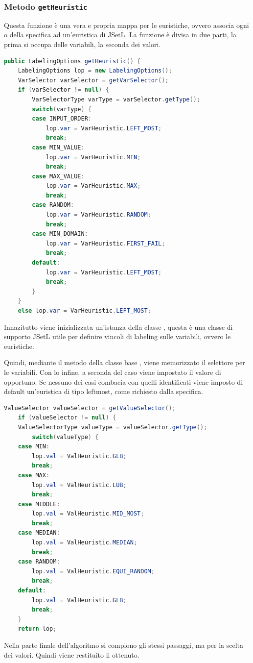 \subsubsection{Metodo \texttt{getHeuristic}}
Questa funzione è una vera e propria mappa per le euristiche, ovvero associa
ogni  o  della specifica ad
un'euristica di JSetL. La funzione è divisa in due parti, la prima si occupa
delle variabili, la seconda dei valori.
\begin{lstlisting}[language = Java,
                   caption = {\files{getHeuristic}, le variabili.}]
public LabelingOptions getHeuristic() {
	LabelingOptions lop = new LabelingOptions();
	VarSelector varSelector = getVarSelector();
	if (varSelector != null) {
		VarSelectorType varType = varSelector.getType();
		switch(varType) {
		case INPUT_ORDER: 
			lop.var = VarHeuristic.LEFT_MOST;
			break;
		case MIN_VALUE:
			lop.var = VarHeuristic.MIN;
			break;
		case MAX_VALUE:
			lop.var = VarHeuristic.MAX;
			break;
		case RANDOM:
			lop.var = VarHeuristic.RANDOM;
			break;
		case MIN_DOMAIN:
			lop.var = VarHeuristic.FIRST_FAIL;
			break;
		default:
			lop.var = VarHeuristic.LEFT_MOST;
			break;
		}
	}
	else lop.var = VarHeuristic.LEFT_MOST;
\end{lstlisting}
Innazitutto viene inizializzata un'istanza della classe
, questa è una classe di supporto JSetL utile per 
definire vincoli di labeling sulle variabili, ovvero le euristiche.

Quindi, mediante il metodo della classe base , viene
memorizzato il selettore per le variabili. Con lo  infine, a 
seconda del caso viene impostato il valore di  opportuno.
Se nessuno dei casi combacia con quelli identificati viene imposto di default
un'euristica di tipo leftmost, come richiesto dalla specifica.
\begin{lstlisting}[language = Java,
                   caption = {\files{getHeuristic}, i valori.}]
    ValueSelector valueSelector = getValueSelector();
    if (valueSelector != null) {
	ValueSelectorType valueType = valueSelector.getType();
        switch(valueType) {
	case MIN:
		lop.val = ValHeuristic.GLB;
		break;
	case MAX:
		lop.val = ValHeuristic.LUB;
		break;
	case MIDDLE:
		lop.val = ValHeuristic.MID_MOST;
		break;
	case MEDIAN:
		lop.val = ValHeuristic.MEDIAN;
		break;
	case RANDOM:
		lop.val = ValHeuristic.EQUI_RANDOM;
		break;
	default:
		lop.val = ValHeuristic.GLB;
		break;
	}
	return lop;
\end{lstlisting}
Nella parte finale dell'algoritmo si compiono gli stessi passaggi, ma per
la scelta dei valori. Quindi viene restituito il 
ottenuto.

